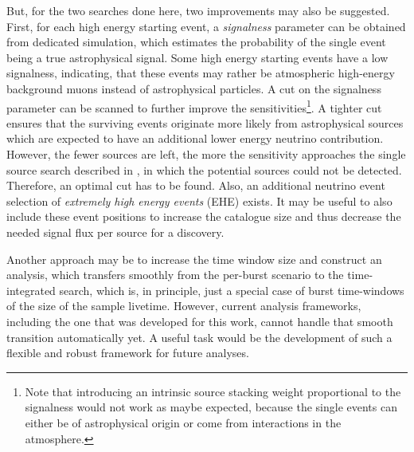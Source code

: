 But, for the two searches done here, two improvements may also be suggested.
First, for each high energy starting event, a \emph{signalness} parameter can be obtained from dedicated simulation, which estimates the probability of the single event being a true astrophysical signal.
Some high energy starting events have a low signalness, indicating, that these events may rather be atmospheric high-energy background muons instead of astrophysical particles.
A cut on the signalness parameter can be scanned to further improve the sensitivities\footnote{Note that introducing an intrinsic source stacking weight proportional to the signalness would not work as maybe expected, because the single events can either be of astrophysical origin or come from interactions in the atmosphere.}.
A tighter cut ensures that the surviving events originate more likely from astrophysical sources which are expected to have an additional lower energy neutrino contribution.
However, the fewer sources are left, the more the sensitivity approaches the single source search described in \cite{Aartsen:2016oji}, in which the potential sources could not be detected.
Therefore, an optimal cut has to be found.
Also, an additional neutrino event selection of \emph{extremely high energy events} (EHE) exists\cite{Yoshida:2017ghs,Aartsen:2016ngq}.
It may be useful to also include these event positions to increase the catalogue size and thus decrease the needed signal flux per source for a discovery.

Another approach may be to increase the time window size and construct an analysis, which transfers smoothly from the per-burst scenario to the time-integrated search, which is, in principle, just a special case of burst time-windows of the size of the sample livetime.
However, current analysis frameworks, including the one that was developed for this work, cannot handle that smooth transition automatically yet.
A useful task would be the development of such a flexible and robust framework for future analyses.



